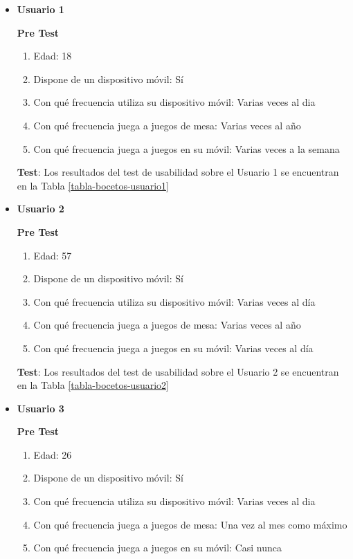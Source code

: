 \begin{itemize}
  \item \textbf{Usuario 1}

  \textbf{Pre Test}

  \begin{enumerate}
    \item Edad: 18
    \item Dispone de un dispositivo móvil: Sí
    \item Con qué frecuencia utiliza su dispositivo móvil: Varias veces al dia
    \item Con qué frecuencia juega a juegos de mesa: Varias veces al año
    \item Con qué frecuencia juega a juegos en su móvil: Varias veces a la semana
  \end{enumerate}

  \textbf{Test}: Los resultados del test de usabilidad sobre el Usuario 1 se encuentran en la Tabla \ref{tabla-bocetos-usuario1}


  \item \textbf{Usuario 2}

  \textbf{Pre Test}

  \begin{enumerate}
    \item Edad: 57
    \item Dispone de un dispositivo móvil: Sí
    \item Con qué frecuencia utiliza su dispositivo móvil: Varias veces al día
    \item Con qué frecuencia juega a juegos de mesa: Varias veces al año
    \item Con qué frecuencia juega a juegos en su móvil: Varias veces al día
  \end{enumerate}

  \textbf{Test}: Los resultados del test de usabilidad sobre el Usuario 2 se encuentran en la Tabla \ref{tabla-bocetos-usuario2}


  \item \textbf{Usuario 3}

  \textbf{Pre Test}

  \begin{enumerate}
    \item Edad: 26
    \item Dispone de un dispositivo móvil: Sí
    \item Con qué frecuencia utiliza su dispositivo móvil: Varias veces al dia
    \item Con qué frecuencia juega a juegos de mesa: Una vez al mes como máximo
    \item Con qué frecuencia juega a juegos en su móvil: Casi nunca
  \end{enumerate}


\end{itemize}
